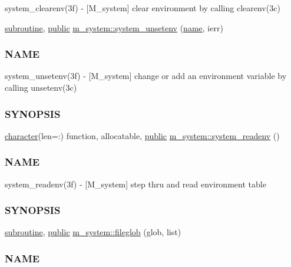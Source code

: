 \begin{DoxyCompactItemize}
\begin{DoxyCompactList}
system\+\_\+clearenv(3f) -\/ \mbox{[}M\+\_\+system\mbox{]} clear environment by calling clearenv(3c) \end{DoxyCompactList}\item 
\hyperlink{M__stopwatch_83_8txt_acfbcff50169d691ff02d4a123ed70482}{subroutine}, \hyperlink{M__stopwatch_83_8txt_a2f74811300c361e53b430611a7d1769f}{public} \hyperlink{namespacem__system_a61b67b46b35490ec308773b65c3376a3}{m\+\_\+system\+::system\+\_\+unsetenv} (\hyperlink{M__stopwatch_83_8txt_a3f508a893ae4c3b397b4383e33b9bcae}{name}, ierr)
\begin{DoxyCompactList}\small\item\em \subsubsection*{N\+A\+ME}

system\+\_\+unsetenv(3f) -\/ \mbox{[}M\+\_\+system\mbox{]} change or add an environment variable by calling unsetenv(3c) \subsubsection*{S\+Y\+N\+O\+P\+S\+IS}\end{DoxyCompactList}\item 
\hyperlink{option__stopwatch_83_8txt_abd4b21fbbd175834027b5224bfe97e66}{character}(len=\+:) function, allocatable, \hyperlink{M__stopwatch_83_8txt_a2f74811300c361e53b430611a7d1769f}{public} \hyperlink{namespacem__system_ae0e43010a82a6a25402568ccb326322d}{m\+\_\+system\+::system\+\_\+readenv} ()
\begin{DoxyCompactList}\small\item\em \subsubsection*{N\+A\+ME}

system\+\_\+readenv(3f) -\/ \mbox{[}M\+\_\+system\mbox{]} step thru and read environment table \subsubsection*{S\+Y\+N\+O\+P\+S\+IS}\end{DoxyCompactList}\item 
\hyperlink{M__stopwatch_83_8txt_acfbcff50169d691ff02d4a123ed70482}{subroutine}, \hyperlink{M__stopwatch_83_8txt_a2f74811300c361e53b430611a7d1769f}{public} \hyperlink{namespacem__system_a79656f76ad75168302e0d770052e901e}{m\+\_\+system\+::fileglob} (glob, list)
\begin{DoxyCompactList}\small\item\em \subsubsection*{N\+A\+ME}


\end{DoxyCompactList}
\end{DoxyCompactItemize}
